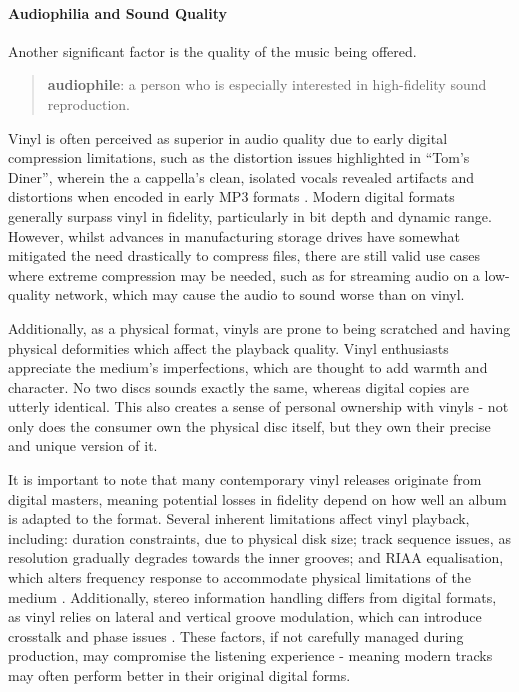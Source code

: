             \paragraph{Audiophilia and Sound Quality}
    
                Another significant factor is the quality of the music being offered.
    
                \begin{quote}
                    \textbf{audiophile}: a person who is especially interested in high-fidelity sound reproduction. \cite{audiophile2025}
                \end{quote}
    
                Vinyl is often perceived as superior in audio quality due to early digital compression limitations, such as the distortion issues highlighted in ``Tom's Diner'', wherein the a cappella's clean, isolated vocals revealed artifacts and distortions when encoded in early MP3 formats \cite{TODO}. Modern digital formats generally surpass vinyl in fidelity, particularly in bit depth and dynamic range. However, whilst advances in manufacturing storage drives have somewhat mitigated the need drastically to compress files, there are still valid use cases where extreme compression may be needed, such as for streaming audio on a low-quality network, which may cause the audio to sound worse than on vinyl.
    
                Additionally, as a physical format, vinyls are prone to being scratched and having physical deformities which affect the playback quality. Vinyl enthusiasts appreciate the medium’s imperfections, which are thought to add warmth and character. No two discs sounds exactly the same, whereas digital copies are utterly identical. This also creates a sense of personal ownership with vinyls - not only does the consumer own the physical disc itself, but they own their precise and unique version of it.
    
                It is important to note that many contemporary vinyl releases originate from digital masters, meaning potential losses in fidelity depend on how well an album is adapted to the format. Several inherent limitations affect vinyl playback, including: duration constraints, due to physical disk size; track sequence issues, as resolution gradually degrades towards the inner grooves; and RIAA equalisation, which alters frequency response to accommodate physical limitations of the medium \cite{engineeringvinyls}. Additionally, stereo information handling differs from digital formats, as vinyl relies on lateral and vertical groove modulation, which can introduce crosstalk and phase issues \cite{engineeringvinyls}. These factors, if not carefully managed during production, may compromise the listening experience - meaning modern tracks may often perform better in their original digital forms.
    
